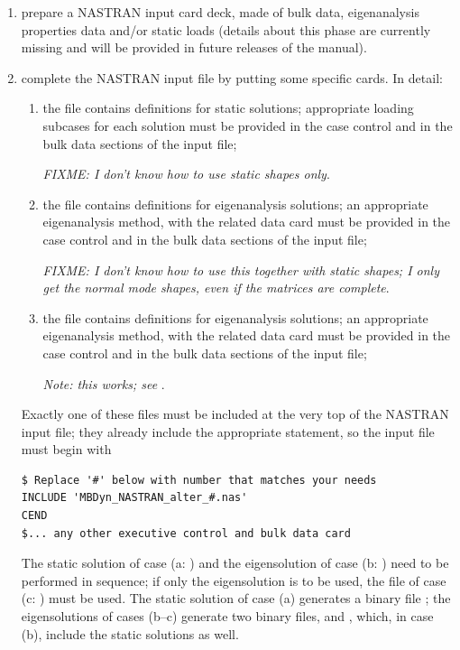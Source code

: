 \begin{enumerate} %

\item prepare a NASTRAN input card deck, made of bulk data,
eigenanalysis properties data and/or static loads (details about 
this phase are currently missing and will be provided in future 
releases of the manual).

\item complete the NASTRAN input file by putting some specific
 cards.
In detail:
\begin{enumerate}
\item the file  contains
	 definitions for static solutions; appropriate
	loading subcases for each solution must be provided
	in the case control and in the bulk data sections
	of the input file;

	\emph{FIXME: I don't know how to use static shapes only}.

\item the file  contains
	 definitions for eigenanalysis solutions;
	an appropriate eigenanalysis method, with the related
	data card must be provided in the case control 
	and in the bulk data sections of the input file;

	\emph{FIXME: I don't know how to use this together
		with static shapes; I only get the normal mode shapes,
		even if the matrices are complete}.

\item the file  contains
	 definitions for eigenanalysis solutions;
	an appropriate eigenanalysis method, with the related
	data card must be provided in the case control 
	and in the bulk data sections of the input file;

	\emph{Note: this works; see} .

\end{enumerate}
Exactly one of these files must be included at the very top 
of the NASTRAN input file;
they already include the appropriate  statement, so the
input file must begin with
\begin{verbatim}
$ Replace '#' below with number that matches your needs
INCLUDE 'MBDyn_NASTRAN_alter_#.nas'
CEND
$... any other executive control and bulk data card
\end{verbatim}
The static solution of case (a: ) and the eigensolution
of case (b: ) need to be performed in sequence; 
if only the eigensolution is to be used, the  file 
of case (c: ) must be used.
The static solution of case (a) generates a binary file ;
the eigensolutions of cases (b--c) generate two binary files, 
 and , which, in case (b), include
the static solutions as well.



\end{enumerate}
